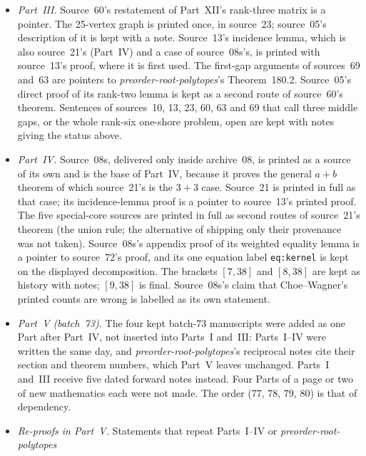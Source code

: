 \documentclass[11pt,a4paper]{article}
\theoremstyle{remark}\newtheorem{remark}[theorem]{Remark}
\newcommand{\ULC}{\operatorname{ULC}}      %
\newcommand{\prp}{\emph{preorder-root-polytopes}}
\begin{document}
\begin{itemize}
  strictness step is kept); its recall of source~55's endpoint theorem is kept
  with pointers to source~55, which is printed before it. Source~73's
  rank-310 example is kept as a remark; it is one-shore, not unit, weighted.
  Statements of sources~55, 47 and~51 that call rank-six one-shore $\ULC$
  open or that leave earlier gaps open are kept with notes.
\item \emph{Part~III.} Source~60's restatement of Part~XII's rank-three
  matrix is a pointer. The 25-vertex graph is printed once, in source~23;
  source~05's description of it is kept with a note. Source~13's incidence
  lemma, which is also source~21's (Part~IV) and a case of source~08s's, is
  printed with source~13's proof, where it is first used. The first-gap
  arguments of sources~69 and~63 are pointers to \prp's Theorem~180.2.
  Source~05's direct proof of its rank-two lemma is kept as a second route of
  source~60's theorem. Sentences of sources~10, 13, 23, 60, 63 and 69 that
  call three middle gaps, or the whole rank-six one-shore problem, open are
  kept with notes giving the status above.
\item \emph{Part~IV.} Source~08s, delivered only inside archive~08, is
  printed as a source of its own and is the base of Part~IV, because it
  proves the general $a+b$ theorem of which source~21's is the $3+3$ case.
  Source~21 is printed in full as that case; its incidence-lemma proof is a
  pointer to source~13's printed proof. The five special-core sources are
  printed in full as second routes of source~21's theorem (the union rule;
  the alternative of shipping only their provenance was not taken). Source~08s's
  appendix proof of its weighted equality lemma is a pointer to source~72's
  proof, and its one equation label \texttt{eq:kernel} is kept on the
  displayed decomposition. The brackets $[7,38]$ and $[8,38]$ are kept as
  history with notes; $[9,38]$ is final. Source~08s's claim that
  Choe--Wagner's printed counts are wrong is labelled as its own statement.
\item \emph{Part~V (batch~73).} The four kept batch-73 manuscripts were added as
  one Part after Part~IV, not inserted into Parts~I and~III: Parts~I--IV were
  written the same day, and \prp's reciprocal notes cite their section and
  theorem numbers, which Part~V leaves unchanged. Parts~I and~III receive five
  dated forward notes instead. Four Parts of a page or two of new mathematics
  each were not made. The order (77, 78, 79, 80) is that of dependency.
\item \emph{Re-proofs in Part~V.} Statements that repeat Parts~I--IV or \prp{}

\end{itemize}
\end{document}
